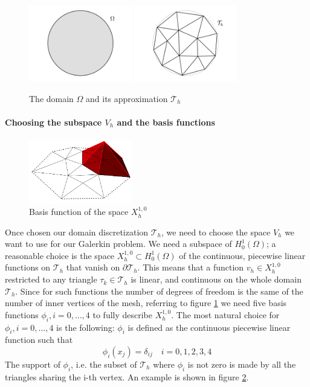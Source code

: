 \begin{figure}[h]\label{fig:omega and mesh}
	\centering
	\includegraphics[width=0.4\textwidth]{figs/Chapter3/omega.png}
	\includegraphics[width=0.4\textwidth]{figs/Chapter3/mesh.png}
	\caption{The domain $\Omega$ and its approximation $\mathcal T_h$}
\end{figure}
\paragraph{Choosing the subspace $V_h$ and the basis functions}
\begin{figure}\label{fig:basis function}
	\begin{center}
		\includegraphics[width=0.4\textwidth]{figs/Chapter3/basisfunction.png}
	\end{center}
	\caption{Basis function of the space $X^{1,0}_h$}
\end{figure}
Once chosen our domain discretization $\mathcal T_h$, we need to choose the space $V_h$ we want to use for our Galerkin problem. We need a subspace of $H_0^1(\Omega)$; a reasonable choice is the space $X_h^{1,0}\subset H_0^1(\Omega)$ of the continuous, piecewise linear functions on $\mathcal T_h$ that vanish on $\partial \mathcal T_h$. This means that a function $v_h\in X_h^{1,0}$ restricted to any triangle $\tau_k\in \mathcal T_h$ is linear, and continuous on the whole domain $\mathcal T_h$. Since for such functions the number of degrees of freedom is the same of the number of inner vertices of the mesh, referring to figure \ref{fig:omega and mesh} we need five basis functions $\phi_i, i=0,...,4$ to fully describe $X_h^{1,0}$. The most natural choice for $\phi_i, i=0,...,4$ is the following: $\phi_i$ is defined as the continuous piecewise linear function such that 
$$
\phi_i(x_j) = \delta_{ij}\quad i=0,1,2,3,4
$$
The support of $\phi_i$, i.e. the subset of $\mathcal T_h$ where $\phi_i$ is not zero is made by all the triangles sharing the i-th vertex. An example is shown in figure \ref{fig:basis function}.

